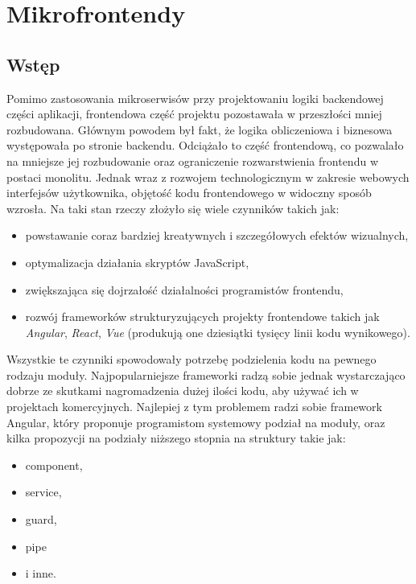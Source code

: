 \documentclass{SGGW-thesis}
\begin{document}
{\chapter{Mikrofrontendy}
\section{Wstęp}
Pomimo zastosowania mikroserwisów przy projektowaniu logiki backendowej części aplikacji, frontendowa część projektu pozostawała w przeszłości mniej rozbudowana. Głównym powodem był fakt, że logika obliczeniowa i biznesowa występowała po stronie backendu. Odciążało to część frontendową, co pozwalało na mniejsze jej rozbudowanie oraz ograniczenie rozwarstwienia frontendu w postaci monolitu. Jednak wraz z rozwojem technologicznym w zakresie webowych interfejsów użytkownika, objętość kodu frontendowego w widoczny sposób wzrosła. Na taki stan rzeczy złożyło się wiele czynników takich jak:

\begin{itemize}
	\item powstawanie coraz bardziej kreatywnych i szczegółowych efektów wizualnych,
	\item optymalizacja działania skryptów JavaScript,
	\item zwiększająca się dojrzałość działalności programistów frontendu,
	\item rozwój frameworków strukturyzujących projekty frontendowe takich jak \textit{Angular}, \textit{React}, \textit{Vue} (produkują one dziesiątki tysięcy linii kodu wynikowego).
\end{itemize}

Wszystkie te czynniki spowodowały potrzebę podzielenia kodu na pewnego rodzaju moduły. Najpopularniejsze frameworki radzą sobie jednak wystarczająco dobrze ze skutkami nagromadzenia dużej ilości kodu, aby używać ich w projektach komercyjnych. Najlepiej z tym problemem radzi sobie framework Angular, który proponuje programistom systemowy podział na moduły, oraz kilka propozycji na podziały niższego stopnia na struktury takie jak:

\begin{itemize}
	\item component,
	\item service,
	\item guard,
	\item pipe
	\item i inne.
\end{itemize}

}
\end{document}
